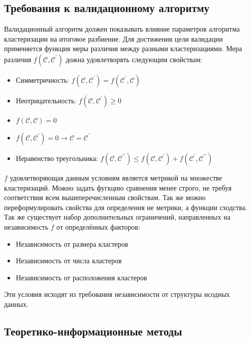 \subsection{Требования к валидационному алгоритму}
Валидационный алгоритм должен показывать влияние параметров алгоритма кластеризации на итоговое разбиение. Для достижения цели валидации применяется функция меры различия между разными кластеризациями. Мера различия $f(\mathcal{C, C^\prime})$ дожна удовлетворять следующим свойствам:
\begin{itemize}
	\item Симметричность: $f(\mathcal{C, C^\prime}) = f(\mathcal{C^\prime, C})$
	\item Неотрицательность: $f(\mathcal{C, C^\prime}) \geq 0$
	\item $f(\mathcal{C, C}) = 0$
	\item $f(\mathcal{C, C^\prime}) = 0 \rightarrow \mathcal{C = C^\prime}$
	\item Неравенство треугольника: $f(\mathcal{C, C^{\prime\prime}}) \leq f(\mathcal{C, C^{\prime}}) + f(\mathcal{C^{\prime}, C^{\prime\prime}})$
\end{itemize}

$f$ удовлетворяющая данным условиям является метрикой на множестве кластеризаций. Можно задать фугкцию сравнения менее строго, не требуя соответствия всем вышеперечисленным свойствам. Так же можно переформулировать свойства для определения не метрики, а функции сходства. Так же существует набор дополнительных ограничений, направленных на независимость $f$ от определённых факторов:
\begin{itemize}
	\item Независимость от размера кластеров
	\item Независимость от числа кластеров
	\item Независимость от расположения кластеров
\end{itemize}

Эти условия исходят из требования независимости от структуры исодных данных.

\subsection{Теоретико-информационные методы} 
